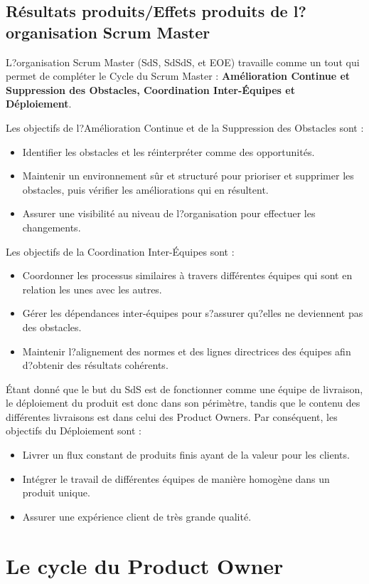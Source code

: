 \documentclass[12pt,a4paper,parskip=full]{scrartcl}
\begin{document}
\subsection{Résultats produits/Effets produits de l?organisation Scrum
Master}
L?organisation Scrum Master (SdS, SdSdS, et EOE) travaille comme un tout qui permet de
compléter le Cycle du Scrum Master : \textbf{Amélioration Continue et Suppression des
Obstacles, Coordination Inter-Équipes et Déploiement}.

Les objectifs de l?Amélioration Continue et de la Suppression des Obstacles sont :
\begin{itemize}
\item Identifier les obstacles et les réinterpréter comme des opportunités.
\item Maintenir un environnement sûr et structuré pour prioriser et supprimer les
obstacles, puis vérifier les améliorations qui en résultent.
\item Assurer une visibilité au niveau de l?organisation pour effectuer les
changements.
\end{itemize}
Les objectifs de la Coordination Inter-Équipes sont :
\begin{itemize}
\item Coordonner les processus similaires à travers différentes équipes qui sont en
relation les unes avec les autres.
\item Gérer les dépendances inter-équipes pour s?assurer qu?elles ne deviennent pas
des obstacles.
\item Maintenir l?alignement des normes et des lignes directrices des équipes afin
d?obtenir des résultats cohérents.
\end{itemize}

Étant donné que le but du SdS est de fonctionner comme une équipe de livraison, le
déploiement du produit est donc dans son périmètre, tandis que le contenu des
différentes livraisons est dans celui des Product Owners. Par conséquent, les objectifs
du Déploiement sont :
\begin{itemize}
\item Livrer un flux constant de produits finis ayant de la valeur pour les clients.
\item Intégrer le travail de différentes équipes de manière homogène dans un produit
unique.
\item Assurer une expérience client de très grande qualité.
\end{itemize}

\section{Le cycle du Product Owner}
\end{document}
